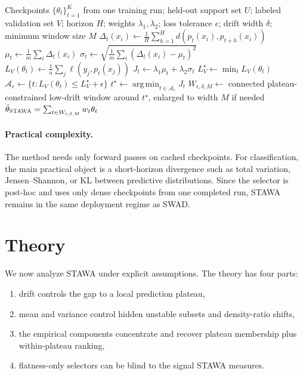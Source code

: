 \documentclass{article}
\newcommand{\argmin}{\operatorname*{arg\,min}}
\newcommand{\stawa}{\textup{\textsc{STAWA}}}
\newcommand{\swad}{\textup{\textsc{SWAD}}}
\begin{document}
\begin{algorithm}[t]
    \caption{\stawa{} (\textsc{Stationarity-Aware Weight Averaging})}
    \label{alg:stawa}
    \begin{algorithmic}[1]
        \Require Checkpoints $\{\theta_t\}_{t=1}^{K}$ from one training run; held-out support set $U$; labeled validation set $V$; horizon $H$; weights $\lambda_1,\lambda_2$; loss tolerance $\epsilon$; drift width $\delta$; minimum window size $M$
                \State $\Delta_t(x_i) \gets \frac{1}{H}\sum_{h=1}^{H} d(p_t(x_i), p_{t+h}(x_i))$
            \EndFor
            \State $\mu_t \gets \frac{1}{m}\sum_i \Delta_t(x_i)$
            \State $\sigma_t \gets \sqrt{\frac{1}{m}\sum_i (\Delta_t(x_i)-\mu_t)^2}$
            \State $L_V(\theta_t) \gets \frac{1}{n}\sum_j \ell(y_j, p_t(x_j))$
            \State $J_t \gets \lambda_1 \mu_t + \lambda_2 \sigma_t$
        \EndFor
        \State $L_V^\star \gets \min_t L_V(\theta_t)$
        \State $\mathcal{A}_{\epsilon} \gets \{ t : L_V(\theta_t) \le L_V^\star + \epsilon\}$
        \State $t^\star \gets \argmin_{t\in \mathcal{A}_{\epsilon}} J_t$
        \State $W_{\epsilon,\delta,M} \gets$ connected plateau-constrained low-drift window around $t^\star$, enlarged to width $M$ if needed
        \State \Return $\bar \theta_{\stawa} = \sum_{t\in W_{\epsilon,\delta,M}} w_t \theta_t$
    \end{algorithmic}
\end{algorithm}

\paragraph{Practical complexity.}
The method needs only forward passes on cached checkpoints. For classification, the main practical object is a short-horizon divergence such as total variation, Jensen--Shannon, or KL between predictive distributions. Since the selector is post-hoc and uses only dense checkpoints from one completed run, \stawa{} remains in the same deployment regime as \swad{}.

\section{Theory}
\label{sec:theory}

We now analyze \stawa{} under explicit assumptions. The theory has four parts:
\begin{enumerate}[leftmargin=1.4em]
    \item drift controls the gap to a local prediction plateau,
    \item mean and variance control hidden unstable subsets and density-ratio shifts,
    \item the empirical components concentrate and recover plateau membership plus within-plateau ranking,
    \item flatness-only selectors can be blind to the signal \stawa{} measures.
\end{enumerate}
\end{document}
